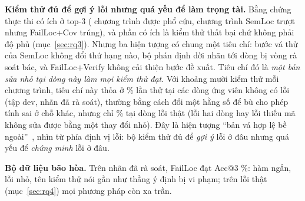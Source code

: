 \textbf{Kiểm thử đủ để gợi ý lỗi nhưng quá yếu để làm trọng tài.} Bằng chứng thực thi có ích ở top-3
(\FailRescuedBySpectrumN{} chương trình được phổ cứu, \FailCoverageOnlyWinsN{} chương trình SemLoc trượt nhưng FailLoc+Cov trúng), và
phần có ích là kiểm thử thất bại chứ không phải độ phủ (mục~\ref{sec:rq3}). Nhưng ba hiện tượng có chung một tiêu chí: bước vá thử của SemLoc
không đổi thứ hạng nào, bộ phán định dời \ReviewCorrectedOverturnedN{} nhãn tới dòng bị vòng rà soát bác, và FailLoc+Verify
không cải thiện bước đề xuất. Tiêu chí đó là \emph{một bản sửa nhỏ tại dòng này làm mọi kiểm thử đạt}. Với
khoảng mười kiểm thử mỗi chương trình, tiêu chí này thỏa ở \PavmechReviewedOtherLineFixable\% lần thử tại các dòng ứng
viên không có lỗi (tập dev, nhãn đã rà soát), thường bằng cách đổi một hằng số để bù cho phép tính sai ở chỗ khác, nhưng chỉ
\PavmechReviewedFaultLineFixable\% tại dòng lỗi thật (lỗi hai dòng hay lỗi thiếu mã không sửa được bằng một thay đổi nhỏ).
Đây là hiện tượng ``bản vá hợp lệ bề ngoài''~\cite{qi2015kali,smith2015cure}, nhìn từ phía định vị lỗi: bộ kiểm thử đủ
để \emph{gợi ý} lỗi ở đâu nhưng quá yếu để \emph{chứng minh} lỗi ở đâu.

\textbf{Bộ dữ liệu bão hòa.} Trên nhãn đã rà soát, FailLoc đạt Acc@3 \RqTwoReviewedAllLlmTestsAccThreeMean\%: hàm ngắn,
lỗi nhỏ, tên kiểm thử nói gần như thẳng ý định bị vi phạm; trên lỗi thật (mục~\ref{sec:rq4}) mọi phương pháp còn xa trần.
